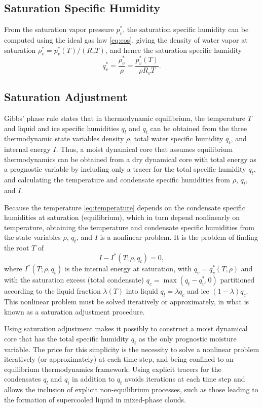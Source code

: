 \documentclass{report}
\begin{document}
\subsection{Saturation Specific Humidity}
\label{sct:sat_spef_hum}
From the saturation vapor pressure $p_v^*$, the saturation specific humidity can be computed using the ideal gas law \eqref{eq:eos}, giving the density of water vapor at saturation $\rho_v^* = p_v^*(T)/(R_v T)$, and hence the saturation specific humidity 
\begin{equation}\label{eq:sat_shum}
     q_v^* = \frac{\rho_v^*}{\rho} = \frac{p_v^*(T)}{\rho R_v T}.
\end{equation}

\subsection{Saturation Adjustment}
\label{sct:sat_adj}
Gibbs' phase rule states that in thermodynamic equilibrium, the temperature $T$ and liquid and ice specific humidities $q_l$ and $q_i$ can be obtained from the three thermodynamic state variables density $\rho$, total water specific humidity $q_t$, and internal energy $I$. Thus, a moist dynamical core that assumes equilibrium thermodynamics can be obtained from a dry dynamical core with total energy as a prognostic variable by including only a tracer for the total specific humidity $q_t$, and calculating the temperature and condensate specific humidities from $\rho$, $q_t$, and $I$. 

Because the temperature \eqref{eq:temperature} depends on the condensate specific humidities at saturation (equilibrium), which in turn depend nonlinearly on temperature, obtaining the temperature and condensate specific humidities from the state variables $\rho$, $q_t$, and $I$ is a nonlinear problem. It is the problem of finding the root $T$ of
\begin{equation}\label{e:sat_adjustment}
I - I^*(T; \rho, q_t) = 0,
\end{equation}
where $I^*(T; \rho, q_t)$ is the internal energy at saturation, with $q_v = q_v^*(T, \rho)$ and with the saturation excess (total condensate) $q_c = \max(q_t - q_v^*, 0)$ partitioned according to the liquid fraction $\lambda(T)$ into liquid $q_l = \lambda q_c$ and ice $(1-\lambda)q_c$. This nonlinear problem must be solved iteratively or approximately, in what is known as a saturation adjustment procedure. 

Using saturation adjustment makes it possibly to construct a moist dynamical core that has the total specific humidity $q_t$ as the only prognostic moisture variable. The price for this simplicity is the necessity to solve a nonlinear problem iteratively (or approximately) at each time step, and being confined to an equilibrium thermodynamics framework. Using explicit tracers for the condensates $q_l$ and $q_i$ in addition to $q_t$ avoids iterations at each time step and allows the inclusion of explicit non-equilibrium processes, such as those leading to the formation of supercooled liquid in mixed-phase clouds. 
\end{document}
